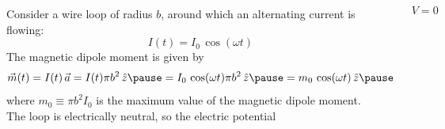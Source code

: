 \documentclass[10pt,aspectratio=169]{beamer}
\newcommand{\za}[1]{\alert{#1}}
\begin{document}
	\begin{frame}
		\small
		\begin{columns}
			\begin{figure}[!htb]
				\centering
				\includegraphics[scale=0.5]{dip-1}
			\end{figure}
			Consider a wire loop of radius $b$, around which an alternating current is flowing:
			\[ I(t) = I_0\, \cos(\omega t) \]
			\pause
			The \za{magnetic dipole moment} is given by
			\begin{dmath}
				\vec{m}(t) = I(t)\, \vec{a} = 	I(t) \pi b^2\, \hat{z} \pause
				= I_0\, \cos(\omega t) \pi b^2\, \hat{z} \pause
				= m_0 \, \cos(\omega t)\, \hat{z} \pause
			\end{dmath}
			where $ m_0 \equiv \pi b^2 I_0 $ is the maximum value of the magnetic dipole moment.\\
			\pause
			The loop is electrically neutral, so the electric potential
			\begin{tcolorbox}[colframe=amber, colback = amber!20]
				\begin{equation}\label{eqn : V}
					V = 0
				\end{equation}
			\end{tcolorbox}
		\end{columns}
		
	\end{frame}
\end{document}
